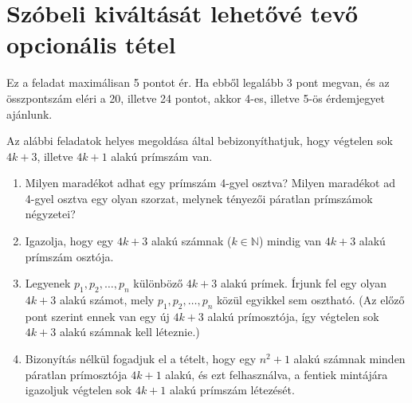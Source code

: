 \documentclass[11pt,a4paper]{article}
\begin{document}
\section{Szóbeli kiváltását lehetővé tevő opcionális tétel}
Ez a feladat maximálisan 5 pontot ér. Ha ebből legalább 3 pont megvan, és az összpontszám eléri a 20, illetve 24 pontot, akkor 4-es, illetve 5-ös érdemjegyet ajánlunk.

Az alábbi feladatok helyes megoldása által bebizonyíthatjuk, hogy végtelen sok $4k+3$, illetve $4k+1$ alakú prímszám van.

\begin{enumerate}

\item Milyen maradékot adhat egy prímszám 4-gyel osztva? Milyen maradékot ad 4-gyel osztva egy olyan szorzat, melynek tényezői páratlan prímszámok négyzetei?
\item Igazolja, hogy egy $4k+3$ alakú számnak ($k\in\mathbb{N}$) mindig van $4k+3$ alakú prímszám osztója. 
\item Legyenek $p_1, p_2, \ldots, p_n$ különböző $4k+3$ alakú prímek. Írjunk fel egy olyan $4k+3$ alakú számot, mely $p_1, p_2,\ldots, p_n$ közül egyikkel sem osztható. (Az előző pont szerint ennek van egy új $4k+3$ alakú prímosztója, így végtelen sok $4k+3$ alakú számnak kell léteznie.)
\item Bizonyítás nélkül fogadjuk el a tételt, hogy egy $n^2+1$ alakú számnak minden páratlan prímosztója $4k+1$ alakú, és ezt felhasználva, a fentiek mintájára igazoljuk végtelen sok $4k+1$ alakú prímszám létezését.



\end{enumerate}
\end{document}
